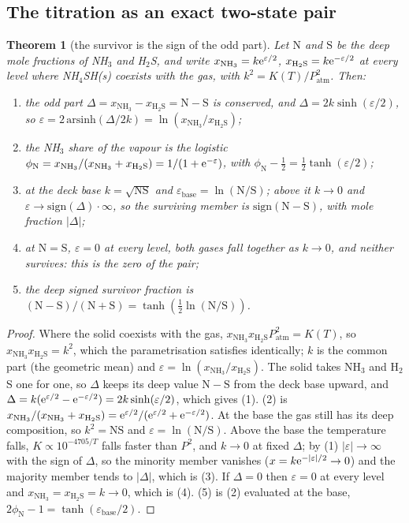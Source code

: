 \documentclass[11pt]{article}
\newtheorem{theorem}{Theorem}
\theoremstyle{definition}\newtheorem{definition}[theorem]{Definition}
\theoremstyle{remark}\newtheorem{remark}[theorem]{Remark}
\newcommand{\NH}{\mathrm{NH_3}}\newcommand{\HS}{\mathrm{H_2S}}\newcommand{\NHSH}{\mathrm{NH_4SH}}
\begin{document}
\subsection{The titration as an exact two-state pair}\label{sec:titration}
\begin{theorem}[the survivor is the sign of the odd part]\label{thm:titration}
Let $\mathrm N$ and $\mathrm S$ be the deep mole fractions of NH$_3$ and H$_2$S, and write $x_{\NH}=k\e^{\varepsilon/2}$, $x_{\HS}=k\e^{-\varepsilon/2}$ at every level where NH$_4$SH(s) coexists with the gas, with $k^2=K(T)/P_\mathrm{atm}^2$. Then:
\begin{enumerate}
\item the odd part $\Delta=x_{\NH}-x_{\HS}=\mathrm N-\mathrm S$ is conserved, and $\Delta=2k\sinh(\varepsilon/2)$, so $\varepsilon=2\,\mathrm{arsinh}(\Delta/2k)=\ln(x_{\NH}/x_{\HS})$;
\item the NH$_3$ share of the vapour is the logistic $\phi_\mathrm{N}=x_{\NH}/(x_{\NH}+x_{\HS})=1/(1+\e^{-\varepsilon})$, with $\phi_\mathrm{N}-\frac12=\frac12\tanh(\varepsilon/2)$;
\item at the deck base $k=\sqrt{\mathrm{NS}}$ and $\varepsilon_\mathrm{base}=\ln(\mathrm N/\mathrm S)$; above it $k\to0$ and $\varepsilon\to\mathrm{sign}(\Delta)\cdot\infty$, so the surviving member is $\mathrm{sign}(\mathrm N-\mathrm S)$, with mole fraction $|\Delta|$;
\item at $\mathrm N=\mathrm S$, $\varepsilon=0$ at every level, both gases fall together as $k\to0$, and neither survives: this is the zero of the pair;
\item the deep signed survivor fraction is $(\mathrm N-\mathrm S)/(\mathrm N+\mathrm S)=\tanh(\frac12\ln(\mathrm N/\mathrm S))$.
\end{enumerate}
\end{theorem}
\begin{proof}
Where the solid coexists with the gas, $x_{\NH}x_{\HS}P_\mathrm{atm}^2=K(T)$, so $x_{\NH}x_{\HS}=k^2$, which the parametrisation satisfies identically; $k$ is the common part (the geometric mean) and $\varepsilon=\ln(x_{\NH}/x_{\HS})$. The solid takes NH$_3$ and H$_2$S one for one, so $\Delta$ keeps its deep value $\mathrm N-\mathrm S$ from the deck base upward, and $\Delta=k(\mathrm e^{\varepsilon/2}-\mathrm e^{-\varepsilon/2})=2k\sinh(\varepsilon/2)$, which gives (1). (2) is $x_{\NH}/(x_{\NH}+x_{\HS})=\e^{\varepsilon/2}/(\e^{\varepsilon/2}+\e^{-\varepsilon/2})$. At the base the gas still has its deep composition, so $k^2=\mathrm{NS}$ and $\varepsilon=\ln(\mathrm N/\mathrm S)$. Above the base the temperature falls, $K\propto10^{-4705/T}$ falls faster than $P^2$, and $k\to0$ at fixed $\Delta$; by (1) $|\varepsilon|\to\infty$ with the sign of $\Delta$, so the minority member vanishes ($x=k\mathrm e^{-|\varepsilon|/2}\to0$) and the majority member tends to $|\Delta|$, which is (3). If $\Delta=0$ then $\varepsilon=0$ at every level and $x_{\NH}=x_{\HS}=k\to0$, which is (4). (5) is (2) evaluated at the base, $2\phi_\mathrm{N}-1=\tanh(\varepsilon_\mathrm{base}/2)$.
\end{proof}
\end{document}
